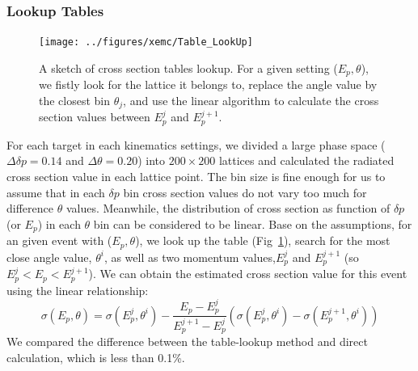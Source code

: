 \documentclass[a4paper,10.5pt]{report}
\begin{document}
\subsubsection{Lookup Tables}
\begin{figure}[!ht]
 \begin{center}
  \texttt{[image: ../figures/xemc/Table\_LookUp]}
  
  \caption[A sketch of cross section tables look-up]{\footnotesize{A sketch of cross section tables lookup. For a given setting ($E_{p}, \theta$), we fistly look for the lattice it belongs to, replace the angle value by the closest bin $\theta_{j}$, and use the linear algorithm to calculate the cross section values between $E_{p}^{j}$ and $E_{p}^{j+1}$.}}
  \label{xs_table}
 \end{center}
\end{figure}
For each target in each kinematics settings, we divided a large phase space ($\Delta\delta p=0.14$ and $\Delta\theta=0.20$) into $200 \times 200$ lattices and calculated the radiated cross section value in each lattice point. The bin size is fine enough for us to assume that in each $\delta p$ bin cross section values do not vary too much for difference $\theta$ values. Meanwhile, the distribution of cross section as function of $\delta p$ (or $E_{p}$) in each $\theta$ bin can be considered to be linear. Base on the assumptions, for an given event with ($E_{p}, \theta$), we look up the table (Fig~\ref{xs_table}), search for the most close angle value, $\theta^{i}$, as well as two momentum values,$E_{p}^{j}$ and $E_{p}^{j+1}$ (so $E_{p}^{j}<E_{p}<E_{p}^{j+1}$). We can obtain the estimated cross section value for this event using the linear relationship:
\begin{equation}
 \sigma(E_{p},\theta) = \sigma(E_{p}^{j},\theta^{i}) - \frac{E_{p}-E_{p}^{j}}{E_{p}^{j+1}-E_{p}^{j}}(\sigma(E_{p}^{j},\theta^{i})-\sigma(E_{p}^{j+1},\theta^{i}))
\end{equation}
We compared the difference between the table-lookup method and direct calculation, which is less than 0.1\%.
\end{document}
